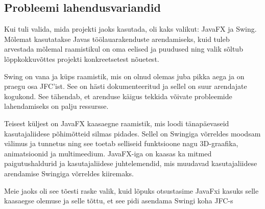 \subsection{Probleemi lahendusvariandid}
Kui tuli valida, mida projekti jaoks kasutada, oli kaks valikut: JavaFX ja Swing. Mõlemat kasutatakse Javas töölauarakenduste arendamiseks, kuid tuleb arvestada mõlemal raamistikul on oma eelised ja puudused ning valik sõltub lõppkokkuvõttes projekti konkreetsetest nõuetest.

Swing on vana ja küps raamistik, mis on olnud olemas juba pikka aega ja on praegu osa JFC'ist. See on hästi dokumenteeritud ja sellel on suur arendajate kogukond. See tähendab, et arenduse käigus tekkida võivate probleemide lahendamiseks on palju ressursse.

Teisest küljest on JavaFX kaasaegne raamistik, mis loodi tänapäevaseid kasutajaliidese põhimõtteid silmas pidades. Sellel on Swingiga võrreldes moodsam välimus ja tunnetus ning see toetab selliseid funktsioone nagu 3D-graafika, animatsioonid ja multimeedium. JavaFX-iga on kaasas ka mitmed paigutushaldurid ja kasutajaliidese juhtelemendid, mis muudavad kasutajaliidese arendamise Swingiga võrreldes kiiremaks.

Meie jaoks oli see tõesti raske valik, kuid lõpuks otsustasime JavaFxi kasuks selle kaasaegse olemuse ja selle tõttu, et see pidi asendama Swingi koha JFC-s
